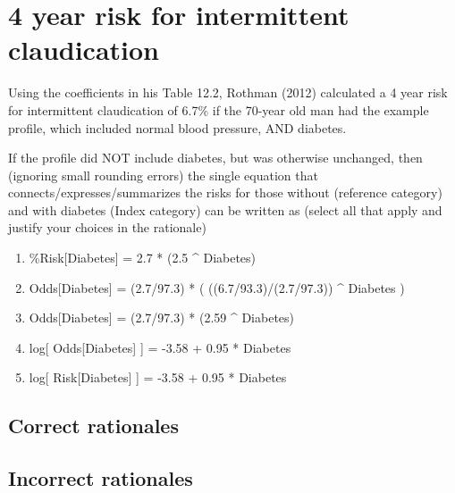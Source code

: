 \documentclass[letterpaper,9pt,twoside,printwatermark=false]{pinp}
\providecommand{\tightlist}{%
  \setlength{\itemsep}{0pt}\setlength{\parskip}{0pt}}
\begin{document}
\section{4 year risk for intermittent
claudication}\label{year-risk-for-intermittent-claudication}

Using the coefficients in his Table 12.2, Rothman (2012) calculated a 4
year risk for intermittent claudication of 6.7\% if the 70-year old man
had the example profile, which included normal blood pressure, AND
diabetes.

If the profile did NOT include diabetes, but was otherwise unchanged,
then (ignoring small rounding errors) the single equation that
connects/expresses/summarizes the risks for those without (reference
category) and with diabetes (Index category) can be written as (select
all that apply and justify your choices in the rationale)

\begin{enumerate}
\def\labelenumi{\alph{enumi}.}
\tightlist
\item
  \%Risk{[}Diabetes{]} = 2.7 * (2.5 \^{} Diabetes)
\item
  Odds{[}Diabetes{]} = (2.7/97.3) * ( ((6.7/93.3)/(2.7/97.3)) \^{}
  Diabetes )
\item
  Odds{[}Diabetes{]} = (2.7/97.3) * (2.59 \^{} Diabetes)
\item
  log{[} Odds{[}Diabetes{]} {]} = -3.58 + 0.95 * Diabetes
\item
  log{[} Risk{[}Diabetes{]} {]} = -3.58 + 0.95 * Diabetes
\end{enumerate}

\subsection{Correct rationales}\label{correct-rationales-7}

\subsection{Incorrect rationales}\label{incorrect-rationales-7}





\end{document}
